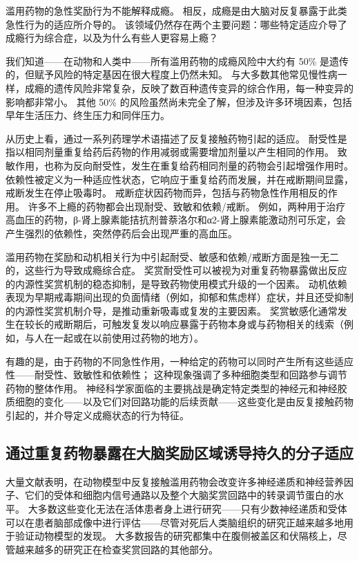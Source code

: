 滥用药物的急性奖励行为不能解释成瘾。 相反，成瘾是由大脑对反复暴露于此类急性行为的适应所介导的。 该领域仍然存在两个主要问题：哪些特定适应介导了成瘾行为综合症，以及为什么有些人更容易上瘾？

我们知道——在动物和人类中——所有滥用药物的成瘾风险中大约有 50\% 是遗传的，但赋予风险的特定基因在很大程度上仍然未知。 与大多数其他常见慢性病一样，成瘾的遗传风险非常复杂，反映了数百种遗传变异的综合作用，每一种变异的影响都非常小。 其他 50\% 的风险虽然尚未完全了解，但涉及许多环境因素，包括早年生活压力、终生压力和同伴压力。

从历史上看，通过一系列药理学术语描述了反复接触药物引起的适应。 耐受性是指以相同剂量重复给药后药物的作用减弱或需要增加剂量以产生相同的作用。 致敏作用，也称为反向耐受性，发生在重复给药相同剂量的药物会引起增强作用时。 依赖性被定义为一种适应性状态，它响应于重复给药而发展，并在戒断期间显露，戒断发生在停止吸毒时。 戒断症状因药物而异，包括与药物急性作用相反的作用。 许多不上瘾的药物都会出现耐受、致敏和依赖/戒断。 例如，两种用于治疗高血压的药物，β-肾上腺素能拮抗剂普萘洛尔和α2-肾上腺素能激动剂可乐定，会产生强烈的依赖性，突然停药后会出现严重的高血压。

滥用药物在奖励和动机相关行为中引起耐受、敏感和依赖/戒断方面是独一无二的，这些行为导致成瘾综合症。 奖赏耐受性可以被视为对重复药物暴露做出反应的内源性奖赏机制的稳态抑制，是导致药物使用模式升级的一个因素。 动机依赖表现为早期戒毒期间出现的负面情绪（例如，抑郁和焦虑样）症状，并且还受抑制的内源性奖赏机制介导，是推动重新吸毒或复发的主要因素。 奖赏敏感化通常发生在较长的戒断期后，可触发复发以响应暴露于药物本身或与药物相关的线索（例如，与人在一起或在以前使用过药物的地方）。

有趣的是，由于药物的不同急性作用，一种给定的药物可以同时产生所有这些适应性——耐受性、致敏性和依赖性； 这种现象强调了多种细胞类型和回路参与调节药物的整体作用。 神经科学家面临的主要挑战是确定特定类型的神经元和神经胶质细胞的变化——以及它们对回路功能的后续贡献——这些变化是由反复接触药物引起的，并介导定义成瘾状态的行为特征。

\subsection{通过重复药物暴露在大脑奖励区域诱导持久的分子适应}
大量文献表明，在动物模型中反复接触滥用药物会改变许多神经递质和神经营养因子、它们的受体和细胞内信号通路以及整个大脑奖赏回路中的转录调节蛋白的水平。 大多数这些变化无法在活体患者身上进行研究——只有少数神经递质和受体可以在患者脑部成像中进行评估——尽管对死后人类脑组织的研究正越来越多地用于验证动物模型的发现。 大多数报告的研究都集中在腹侧被盖区和伏隔核上，尽管越来越多的研究正在检查奖赏回路的其他部分。

